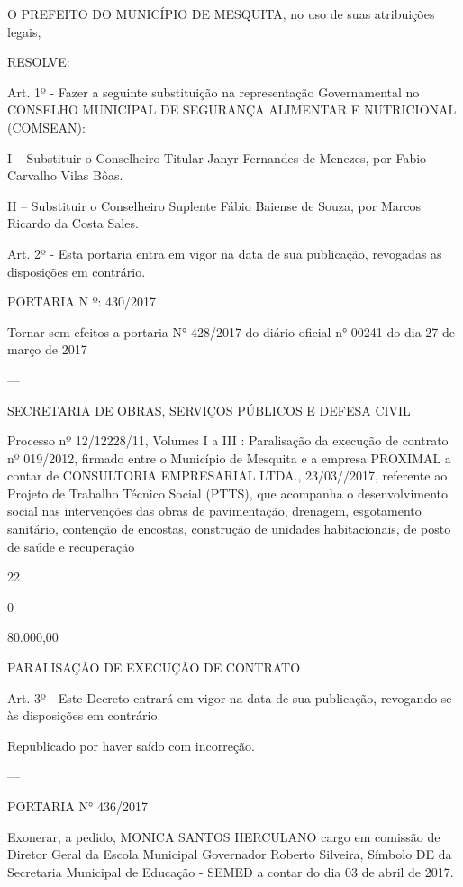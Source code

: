 \documentclass{doliberto}
\begin{document}
O  PREFEITO  DO  MUNICÍPIO  DE  MESQUITA,  no  uso  de 
suas atribuições legais,  

RESOLVE:  

Art.  1º  -  Fazer  a  seguinte  substituição  na  representação 
Governamental no CONSELHO MUNICIPAL DE SEGURANÇA 
ALIMENTAR E NUTRICIONAL (COMSEAN):  

I  –  Substituir  o  Conselheiro  Titular  Janyr  Fernandes  de 
Menezes, por Fabio Carvalho Vilas Bôas.  

II  –  Substituir  o  Conselheiro  Suplente  Fábio  Baiense  de 
Souza, por Marcos Ricardo da Costa Sales. 

Art.  2º  -  Esta  portaria  entra  em  vigor  na  data  de  sua 
publicação, revogadas as disposições em contrário.  

PORTARIA N º: 430/2017 

Tornar sem efeitos a portaria N° 428/2017 do diário oficial 
n° 00241 do dia 27 de março de 2017 

---

SECRETARIA DE OBRAS, SERVIÇOS PÚBLICOS E DEFESA 
CIVIL 

Processo nº 12/12228/11, Volumes I a III : Paralisação da 
execução  de  contrato  nº  019/2012,  firmado  entre  o 
Município  de  Mesquita  e  a  empresa 
  PROXIMAL 
  a  contar  de 
CONSULTORIA  EMPRESARIAL  LTDA., 
23/03//2017,  referente  ao  Projeto  de  Trabalho  Técnico 
Social  (PTTS),  que  acompanha  o  desenvolvimento  social 
nas  intervenções  das    obras  de  pavimentação,  drenagem, 
esgotamento  sanitário,  contenção  de  encostas,  construção 
de unidades habitacionais, de posto de saúde e recuperação 

22 

0 

80.000,00 

PARALISAÇÃO DE EXECUÇÃO DE CONTRATO 

Art.  3º  -  Este  Decreto  entrará  em  vigor  na  data  de  sua 
publicação,  revogando-se  às  disposições  em  contrário. 
 
Republicado por haver saído com incorreção. 

---
 
PORTARIA N° 436/2017 
 
Exonerar,  a  pedido,  MONICA  SANTOS  HERCULANO cargo 
em  comissão  de  Diretor  Geral  da  Escola  Municipal 
Governador  Roberto  Silveira,  Símbolo  DE  da  Secretaria 
Municipal  de  Educação  -  SEMED  a  contar  do  dia  03  de 
abril de 2017. 
 
\end{document}
